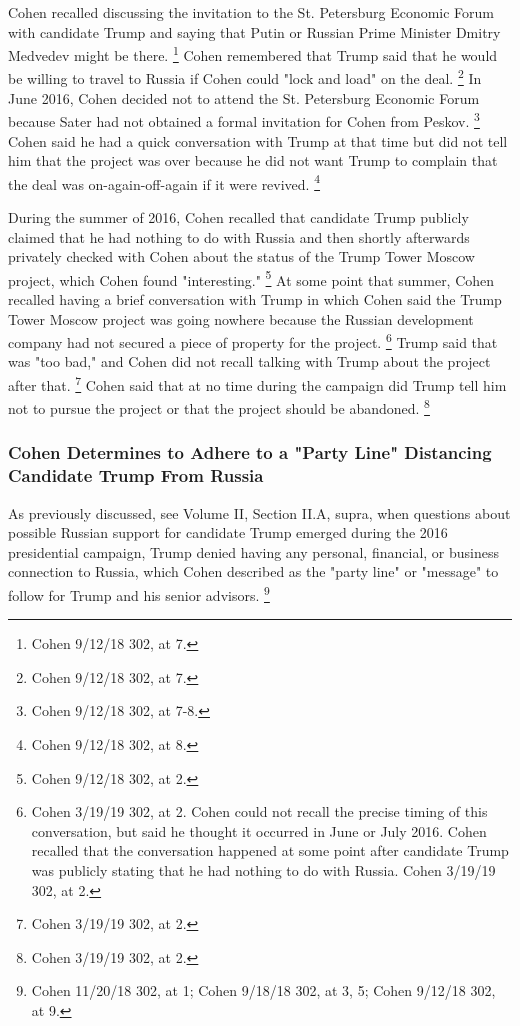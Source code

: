 {Cohen recalled discussing the invitation to the St. Petersburg Economic Forum with candidate Trump and saying that Putin or Russian Prime Minister Dmitry Medvedev might be there.%
\footnote{Cohen 9/12/18 302, at 7.}
Cohen remembered that Trump said that he would be willing to travel to Russia if Cohen could "lock and load" on the deal.%
\footnote{Cohen 9/12/18 302, at 7.}
In June 2016, Cohen decided not to attend the St. Petersburg Economic Forum because Sater had not obtained a formal invitation for Cohen from Peskov.%
\footnote{Cohen 9/12/18 302, at 7-8.}
Cohen said he had a quick conversation with Trump at that time but did not tell him that the project was over because he did not want Trump to complain that the deal was on-again-off-again if it were revived.%
\footnote{Cohen 9/12/18 302, at 8.}

During the summer of 2016, Cohen recalled that candidate Trump publicly claimed that he had nothing to do with Russia and then shortly afterwards privately checked with Cohen about the status of the Trump Tower Moscow project, which Cohen found "interesting."%
\footnote{Cohen 9/12/18 302, at 2.}
At some point that summer, Cohen recalled having a brief conversation with Trump in which Cohen said the Trump Tower Moscow project was going nowhere because the Russian development company had not secured a piece of property for the project.%
\footnote{Cohen 3/19/19 302, at 2.
Cohen could not recall the precise timing of this conversation, but said he thought it occurred in June or July 2016.
Cohen recalled that the conversation happened at some point after candidate Trump was publicly stating that he had nothing to do with Russia.
Cohen 3/19/19 302, at 2.}
Trump said that was "too bad," and Cohen did not recall talking with Trump about the project after that.%
\footnote{Cohen 3/19/19 302, at 2.}
Cohen said that at no time during the campaign did Trump tell him not to pursue the project or that the project should be abandoned.%
\footnote{Cohen 3/19/19 302, at 2.}

\subsubsection{Cohen Determines to Adhere to a "Party Line" Distancing Candidate Trump From Russia}

As previously discussed, see Volume II, Section II.A, supra, when questions about possible Russian support for candidate Trump emerged during the 2016 presidential campaign, Trump denied having any personal, financial, or business connection to Russia, which Cohen described as the "party line" or "message" to follow for Trump and his senior advisors.%
\footnote{Cohen 11/20/18 302, at 1;
Cohen 9/18/18 302, at 3, 5;
Cohen 9/12/18 302, at 9.}

}
